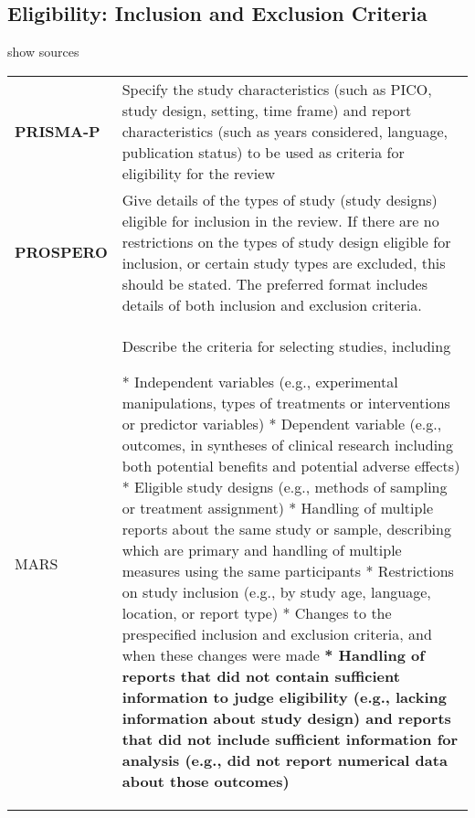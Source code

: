 \documentclass[
]{article}
\begin{document}
\hypertarget{eligibility-inclusion-and-exclusion-criteria}{%
\subsection{Eligibility: Inclusion and Exclusion
Criteria}\label{eligibility-inclusion-and-exclusion-criteria}}

show sources

\hypertarget{eiaec}{}
\begin{collapse}

\begin{table}[H]
\centering
\begin{tabular}{>{}l|l}
\hline
\cellcolor[HTML]{ececec}{source} & \cellcolor[HTML]{ececec}{description}\\
\hline
\textbf{PRISMA-P} & Specify the study characteristics (such as PICO, study design, setting, time frame) and report characteristics (such as years considered, language, publication status) to be used as criteria for eligibility for the review\\
\hline
\textbf{PROSPERO} & Give details of the types of study (study designs) eligible for inclusion in the review. If there are no restrictions on the types of study design eligible for inclusion, or certain study types are excluded, this should be stated. The preferred format includes details of both inclusion and exclusion criteria.\\
\hline
MARS & Describe the criteria for selecting studies, including

* Independent variables (e.g., experimental manipulations, types of treatments or interventions or predictor variables)
* Dependent variable (e.g., outcomes, in syntheses of clinical research including both potential benefits and potential adverse effects)
* Eligible study designs (e.g., methods of sampling or treatment assignment)
* Handling of multiple reports about the same study or sample, describing which are primary and handling of multiple measures using the same participants
* Restrictions on study inclusion (e.g., by study age, language, location, or report type)
* Changes to the prespecified inclusion and exclusion criteria, and when these changes were made
\textbf{* Handling of reports that did not contain sufficient information to judge eligibility (e.g., lacking information about study design) and reports that did not include sufficient information for analysis (e.g., did not report numerical data about those outcomes)}\\
\hline
\end{tabular}
\end{table}

\end{collapse}
\end{document}
